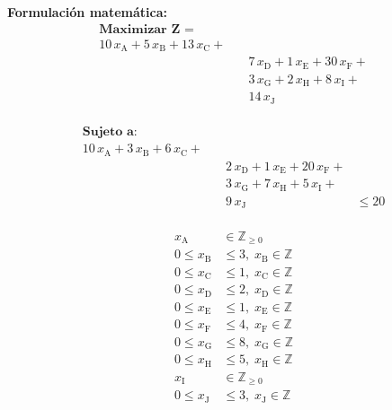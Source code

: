 \documentclass[12pt]{article}
\begin{document}
\textbf{Formulación matemática:}\\
\begin{align*}
\textbf{Maximizar Z = }\\
10\,x_{\text{A}} + 5\,x_{\text{B}} + 13\,x_{\text{C}} +  \\
&\quad 7\,x_{\text{D}} + 1\,x_{\text{E}} + 30\,x_{\text{F}} +  \\
&\quad 3\,x_{\text{G}} + 2\,x_{\text{H}} + 8\,x_{\text{I}} +  \\
&\quad 14\,x_{\text{J}}
\end{align*}
\bigskip\bigskip
\textbf{}\\
\begin{align*}
\textbf{Sujeto a:}\\
10\,x_{\text{A}} + 3\,x_{\text{B}} + 6\,x_{\text{C}} +  \\
&\quad 2\,x_{\text{D}} + 1\,x_{\text{E}} + 20\,x_{\text{F}} +  \\
&\quad 3\,x_{\text{G}} + 7\,x_{\text{H}} + 5\,x_{\text{I}} +  \\
&\quad 9\,x_{\text{J}} &\leq 20
\end{align*}
\bigskip\bigskip
\textbf{}\\
\begin{align*}
x_{\text{A}} &\in \mathbb{Z}_{\geq 0}\\
0 \leq x_{\text{B}} &\leq 3,\; x_{\text{B}} \in \mathbb{Z}\\
0 \leq x_{\text{C}} &\leq 1,\; x_{\text{C}} \in \mathbb{Z}\\
0 \leq x_{\text{D}} &\leq 2,\; x_{\text{D}} \in \mathbb{Z}\\
0 \leq x_{\text{E}} &\leq 1,\; x_{\text{E}} \in \mathbb{Z}\\
0 \leq x_{\text{F}} &\leq 4,\; x_{\text{F}} \in \mathbb{Z}\\
0 \leq x_{\text{G}} &\leq 8,\; x_{\text{G}} \in \mathbb{Z}\\
0 \leq x_{\text{H}} &\leq 5,\; x_{\text{H}} \in \mathbb{Z}\\
x_{\text{I}} &\in \mathbb{Z}_{\geq 0}\\
0 \leq x_{\text{J}} &\leq 3,\; x_{\text{J}} \in \mathbb{Z}\\
\end{align*}
\end{document}
